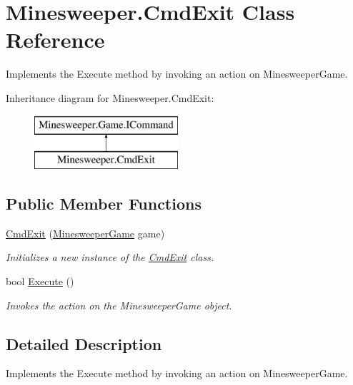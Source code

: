 \hypertarget{class_minesweeper_1_1_cmd_exit}{\section{Minesweeper.\+Cmd\+Exit Class Reference}
\label{class_minesweeper_1_1_cmd_exit}
}


Implements the Execute method by invoking an action on Minesweeper\+Game.  


Inheritance diagram for Minesweeper.\+Cmd\+Exit\+:\begin{figure}[H]
\begin{center}
\leavevmode
\includegraphics[height=2.000000cm]{class_minesweeper_1_1_cmd_exit}
\end{center}
\end{figure}
\subsection*{Public Member Functions}
\begin{DoxyCompactItemize}
\item 
\hyperlink{class_minesweeper_1_1_cmd_exit_aa7d366e7ba946bbb30a04c374cd8e946}{Cmd\+Exit} (\hyperlink{class_minesweeper_1_1_game_1_1_minesweeper_game}{Minesweeper\+Game} game)
\begin{DoxyCompactList}\small\item\em Initializes a new instance of the \hyperlink{class_minesweeper_1_1_cmd_exit}{Cmd\+Exit} class. \end{DoxyCompactList}\item 
bool \hyperlink{class_minesweeper_1_1_cmd_exit_a218e1498a94ac5b49f0dab48d4f154aa}{Execute} ()
\begin{DoxyCompactList}\small\item\em Invokes the action on the Minesweeper\+Game object. \end{DoxyCompactList}\end{DoxyCompactItemize}


\subsection{Detailed Description}
Implements the Execute method by invoking an action on Minesweeper\+Game. 



